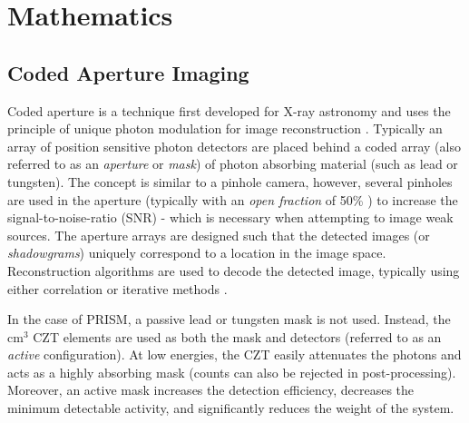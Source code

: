 \documentclass[10pt]{article}
\begin{document}
\section{Mathematics}


\subsection{Coded Aperture Imaging}

Coded aperture is a technique first developed for X-ray astronomy and uses the principle of unique photon modulation for image reconstruction \cite{Dicke1968}. Typically an array of position sensitive photon detectors are placed behind a coded array (also referred to as an \emph{aperture} or \emph{mask}) of photon absorbing material (such as lead or tungsten). The concept is similar to a pinhole camera, however, several pinholes are used in the aperture (typically with an \emph{open fraction} of 50\% \cite{FenimoreCannon1978}) to increase the signal-to-noise-ratio (SNR) - which is necessary when attempting to image weak sources. The aperture arrays are designed such that the detected images (or \emph{shadowgrams}) uniquely correspond to a location in the image space. Reconstruction algorithms are used to decode the detected image, typically using either correlation or iterative methods \cite{FenimoreCannon1978, LangeCarson1984}.


In the case of PRISM, a passive lead or tungsten mask is not used. Instead, the cm$^3$ CZT elements are used as both the mask and detectors (referred to as an \emph{active} configuration). At low energies, the CZT easily attenuates the photons and acts as a highly absorbing mask (counts can also be rejected in post-processing). Moreover, an active mask increases the detection efficiency, decreases the minimum detectable activity, and significantly reduces the weight of the system.
\end{document}
